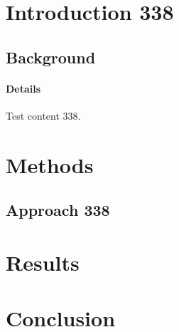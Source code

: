 \documentclass{article}
\begin{document}
\section{Introduction 338}
\subsection{Background}
\paragraph{Details} Test content 338.
\section{Methods}
\subsection{Approach 338}
\section{Results}
\section{Conclusion}
\end{document}
